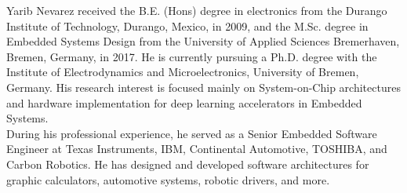 \begin{IEEEbiography}{Yarib Nevarez} received the B.E. (Hons) degree in electronics from the Durango Institute of Technology, Durango, Mexico, in 2009, and the M.Sc. degree in Embedded Systems Design from the University of Applied Sciences Bremerhaven, Bremen, Germany, in 2017. He is currently pursuing a Ph.D. degree with the Institute of Electrodynamics and Microelectronics, University of Bremen, Germany. His research interest is focused mainly on System-on-Chip architectures and hardware implementation for deep learning accelerators in Embedded Systems.
\\
During his professional experience, he served as a Senior Embedded Software Engineer at Texas Instruments, IBM, Continental Automotive, TOSHIBA, and Carbon Robotics. He has designed and developed software architectures for graphic calculators, automotive systems, robotic drivers, and more.
	
\end{IEEEbiography}

